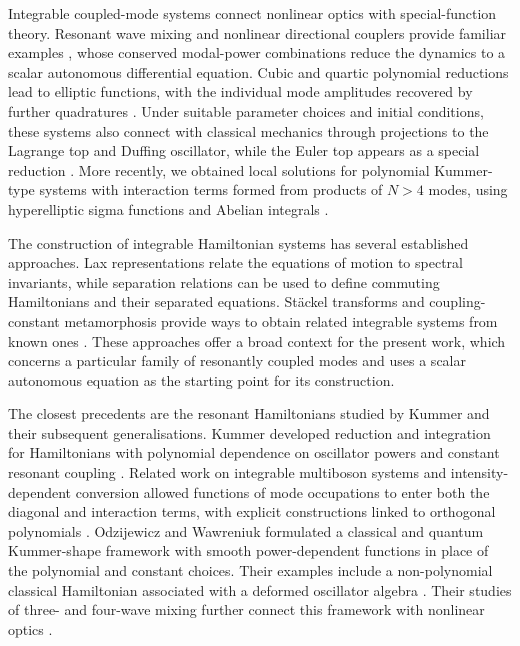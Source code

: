 \documentclass[11pt,a4paper]{article}
\numberwithin{equation}{section}
\begin{document}
Integrable coupled-mode systems connect nonlinear optics with special-function theory. Resonant wave mixing and nonlinear directional couplers provide familiar examples \cite{armstrongInteractionsLightWaves1962,stolenParametricAmplificationFrequency1982,chenFourphotonParametricMixing1989,chenFourwaveMixingOptical1989,agrawalNonlinearFiberOptics2019,jensenNonlinearCoherentCoupler1982}, whose conserved modal-power combinations reduce the dynamics to a scalar autonomous differential equation. Cubic and quartic polynomial reductions lead to elliptic functions, with the individual mode amplitudes recovered by further quadratures \cite{jensenNonlinearCoherentCoupler1982,heskethGeneralComplexEnvelope2015,heskethFWMWeierstrassElliptic2026,heskethCompleteWeierstrassElliptic2026}. Under suitable parameter choices and initial conditions, these systems also connect with classical mechanics through projections to the Lagrange top and Duffing oscillator, while the Euler top appears as a special reduction \cite{Whittaker1937,kovacicJacobiEllipticFunctions2016}. More recently, we obtained local solutions for polynomial Kummer-type systems with interaction terms formed from products of $N>4$ modes, using hyperelliptic sigma functions and Abelian integrals \cite{zotero-item-855}.

The construction of integrable Hamiltonian systems has several established approaches. Lax representations relate the equations of motion to spectral invariants, while separation relations can be used to define commuting Hamiltonians and their separated equations. Stäckel transforms and coupling-constant metamorphosis provide ways to obtain related integrable systems from known ones \cite{krishnaswamiIntroductionLaxPairs2020,blaszakGeneralizedStackelSystems2011,sergyeyevCouplingConstantMetamorphosis2012}. These approaches offer a broad context for the present work, which concerns a particular family of resonantly coupled modes and uses a scalar autonomous equation as the starting point for its construction.

The closest precedents are the resonant Hamiltonians studied by Kummer and their subsequent generalisations. Kummer developed reduction and integration for Hamiltonians with polynomial dependence on oscillator powers and constant resonant coupling \cite{kummerResonantClassicalHamiltonians1990}. Related work on integrable multiboson systems and intensity-dependent conversion allowed functions of mode occupations to enter both the diagonal and interaction terms, with explicit constructions linked to orthogonal polynomials \cite{odzijewiczIntegrableMultibosonSystems2001,horowskiSystemsIntensitydependentConversion2004}. Odzijewicz and Wawreniuk formulated a classical and quantum Kummer-shape framework with smooth power-dependent functions in place of the polynomial and constant choices. Their examples include a non-polynomial classical Hamiltonian associated with a deformed oscillator algebra \cite{odzijewiczClassicalQuantumKummer2016}. Their studies of three- and four-wave mixing further connect this framework with nonlinear optics \cite{odzijewiczIntegrabilityCorrespondenceClassical2018,odzijewiczIntegrableClassicalQuantum2020}.
\end{document}
